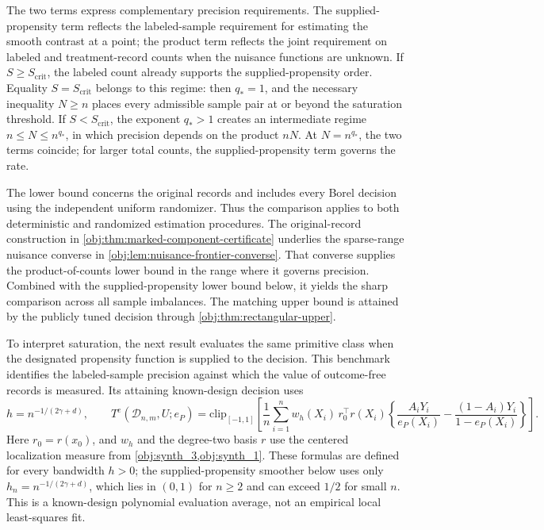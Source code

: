The two terms express complementary precision requirements. The supplied-propensity term reflects the labeled-sample requirement for estimating the smooth contrast at a point; the product term reflects the joint requirement on labeled and treatment-record counts when the nuisance functions are unknown. If \(S\ge S_{\mathrm{crit}}\), the labeled count already supports the supplied-propensity order. Equality \(S=S_{\mathrm{crit}}\) belongs to this regime: then \(q_*=1\), and the necessary inequality \(N\ge n\) places every admissible sample pair at or beyond the saturation threshold. If \(S<S_{\mathrm{crit}}\), the exponent \(q_*>1\) creates an intermediate regime \(n\le N\le n^{q_*}\), in which precision depends on the product \(nN\). At \(N=n^{q_*}\), the two terms coincide; for larger total counts, the supplied-propensity term governs the rate.

The lower bound concerns the original records and includes every Borel decision using the independent uniform randomizer. Thus the comparison applies to both deterministic and randomized estimation procedures. The original-record construction in \cref{obj:thm:marked-component-certificate} underlies the sparse-range nuisance converse in \cref{obj:lem:nuisance-frontier-converse}. That converse supplies the product-of-counts lower bound in the range where it governs precision. Combined with the supplied-propensity lower bound below, it yields the sharp comparison across all sample imbalances. The matching upper bound is attained by the publicly tuned decision through \cref{obj:thm:rectangular-upper}.

To interpret saturation, the next result evaluates the same primitive class when the designated propensity function is supplied to the decision. This benchmark identifies the labeled-sample precision against which the value of outcome-free records is measured. Its attaining known-design decision uses
\[
h=n^{-1/(2\gamma+d)},\qquad
T^e(\mathcal D_{n,m},U;e_P)
=\mathrm{clip}_{[-1,1]}\!\left[
\frac1n\sum_{i=1}^n
w_h(X_i)\,r_0^\top r(X_i)
\left\{
\frac{A_iY_i}{e_P(X_i)}-
\frac{(1-A_i)Y_i}{1-e_P(X_i)}
\right\}
\right].
\]
Here \(r_0=r(x_0)\), and \(w_h\) and the degree-two basis \(r\) use the centered localization measure from \cref{obj:synth_3,obj:synth_1}. These formulas are defined for every bandwidth \(h>0\); the supplied-propensity smoother below uses only \(h_n=n^{-1/(2\gamma+d)}\), which lies in \((0,1)\) for \(n\ge2\) and can exceed \(1/2\) for small \(n\). This is a known-design polynomial evaluation average, not an empirical local least-squares fit.

